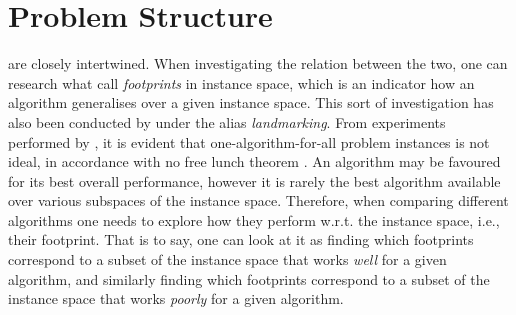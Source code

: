 
\chapter{Problem Structure}\label{ch:problemstructure} 



 are closely intertwined. When investigating the relation between the two, one can research what \citet{Corne10} call \emph{footprints} in instance space, which is an indicator how an algorithm generalises over a given instance space. This sort of investigation has also been conducted by \citet{Pfahringer00} under the alias \emph{landmarking}. 
From experiments performed by \citeauthor{Corne10}, it is evident that one-algorithm-for-all problem instances is not ideal, in accordance with no free lunch theorem \citep{Wolpert97nofree}. An algorithm may be favoured for its best overall performance, however it is rarely the best algorithm available over various subspaces of the instance space.
Therefore, when comparing different algorithms one needs to explore how they perform w.r.t. the instance space, i.e., their footprint. That is to say, one can look at it as finding which footprints correspond to a subset of the instance space that works \emph{well} for a given algorithm, and similarly finding which footprints correspond to a subset of the instance space that works \emph{poorly} for a given algorithm. 

